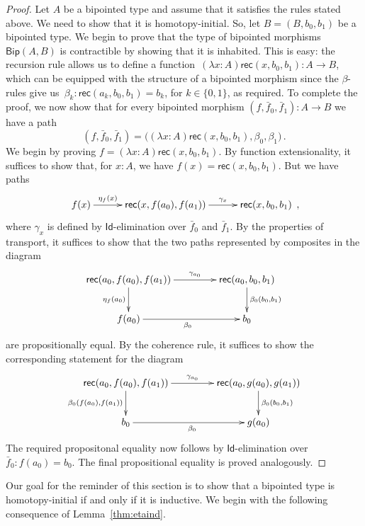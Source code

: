 \documentclass[10pt,a4paper,oneside,reqno]{amsart}
\numberwithin{equation}{section}
\theoremstyle{mythm}
\theoremstyle{mydef}
\theoremstyle{myrmk}
\newcommand{\co}{\colon}
\newcommand{\Id}{\mathsf{Id}}
\newcommand{\rec}{\mathsf{rec}}
\newcommand{\Bip}{\mathsf{Bip}}
\begin{document}
\begin{proof} Let $A$ be a bipointed type
and assume that it satisfies the rules stated above. We need to show that it is homotopy-initial. So, let $B = (B, b_0, b_1)$ be a bipointed type. We begin to prove
that the type of bipointed morphisms $\Bip(A,B)$ is contractible by showing that it is inhabited. This is easy: the recursion rule allows us to define a function~$(\lambda x \co A) \rec(x, b_0, b_1) \co A \to B$, 
which can be equipped with the structure of a bipointed morphism since the $\beta$-rules give 
us~$\beta_k \co \rec(a_k, b_0, b_1) = b_k$, for $k \in \{ 0, 1\}$, as required. To complete the proof, we now show that for every bipointed morphism $(f, \bar{f}_0, \bar{f}_1) \co A \to B$ we have a path
\[
(f, \bar{f}_0, \bar{f}_1) = 
\big( (\lambda x \co A) \rec(x, b_0, b_1), \beta_0, \beta_1 \big)      \, .
 \]
We begin by proving $f = (\lambda x \co A) \rec(x, b_0, b_1)$. By function extensionality, it suffices to show that, for $x \co A$, we have $ f(x) =  \rec(x, b_0, b_1)$.
But we have paths
\[
\xymatrix@C=1cm{
f(x) \ar[r]^-{\eta_f(x)} & \rec(x, f(a_0), f(a_1)) \ar[r]^-{\gamma_x} &  \rec(x, b_0, b_1) }  \, ,
\] 
where $\gamma_x$ is defined by $\Id$-elimination over $\bar{f}_0$ and $\bar{f}_1$. 
By the properties of transport, it suffices to show that the two paths represented
by composites in the diagram
\[
\xymatrix@C=1.5cm{
\rec(a_0, f(a_0), f(a_1)) \ar[d]_{\eta_f(a_0)} \ar[r]^-{\gamma_{a_0}} & \rec(a_0, b_0, b_1) \ar[d]^{\beta_0(b_0, b_1)} \\
f(a_0) \ar[r]_{\beta_0} & b_0}
\]
are propositionally equal. By the coherence rule, it suffices to show the corresponding
statement for the diagram
\[
\xymatrix@C=1.5cm{
 \rec(a_0, f(a_0), f(a_1))  \ar[d]_{\beta_0( f(a_0), f(a_1))}\ar[r]^-{\gamma_{a_0}} &  \rec(a_0, g(a_0), g(a_1))
 \ar[d]^{\beta_0(b_0, b_1)} \\
 b_0 \ar[r]_{\beta_0} & g(a_0)}
\]
The required propositonal equality now follows by $\Id$-elimination over $\bar{f}_0 \co f(a_0) = b_0$. The final
propositional equality is proved analogously.
\end{proof} 







Our goal for the reminder of this section is to show that a bipointed type is homotopy-initial if and only
if it is inductive. We begin with the following consequence of Lemma~\ref{thm:etaind}.
\end{document}
